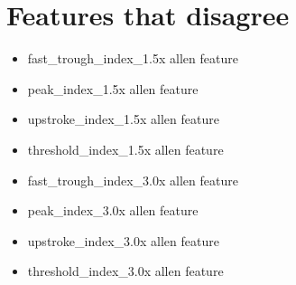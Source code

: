 \section{Features that disagree} 
\begin{itemize}

    \item fast\_trough\_index\_1.5x allen feature
    \item peak\_index\_1.5x allen feature
    \item upstroke\_index\_1.5x allen feature
    \item threshold\_index\_1.5x allen feature
    \item fast\_trough\_index\_3.0x allen feature
    \item peak\_index\_3.0x allen feature
    \item upstroke\_index\_3.0x allen feature
    \item threshold\_index\_3.0x allen feature
\end{itemize}


